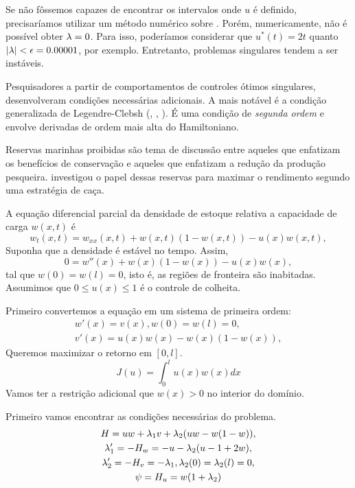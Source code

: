 Se não fôssemos capazes de encontrar os intervalos onde $u$ é definido,
precisaríamos utilizar um método numérico sobre . Porém,
numericamente, não é possível obter $\lambda = 0$. Para isso, poderíamos
considerar que $u^*(t) = 2t$ quanto $|\lambda| < \epsilon = 0.00001$, por exemplo.
Entretanto, problemas singulares tendem a ser instáveis. 

Pesquisadores a partir de comportamentos de controles ótimos singulares,
desenvolveram condições necessárias adicionais. A mais notável é a condição
generalizada de Legendre-Clebsh (\cite{Tsypkin1970AppliedOC}, \cite{Grossmann1984}, \cite{krener1977}). É uma condição de \textit{segunda ordem} e
envolve derivadas de ordem mais alta do Hamiltoniano. 

\begin{example}
    Reservas marinhas proibidas são tema de discussão entre aqueles que
    enfatizam os benefícios de conservação e aqueles que enfatizam a redução
    da produção pesqueira. \cite{neubert2003} investigou o papel dessas reservas para
    maximar o rendimento segundo uma estratégia de caça. 

    A equação diferencial parcial da densidade de estoque relativa a
    capacidade de carga $w(x,t)$ é 
    $$ 
    w_t(x,t) = w_{xx}(x,t) + w(x,t)(1 - w(x,t)) - u(x)w(x,t),
    $$
    Suponha que a densidade é estável no tempo. Assim, 
    $$
    0 = w''(x) + w(x)(1 - w(x)) - u(x)w(x),
    $$
    tal que $w(0) = w(l) = 0$, isto é, as regiões de fronteira são inabitadas.
    Assumimos que $0 \le u(x) \le 1$ é o controle de colheita. 

    Primeiro convertemos a equação em um sistema de primeira ordem:
    \begin{gather*}
        w'(x) = v(x), w(0) = w(l) = 0, \\
        v'(x) = u(x)w(x) - w(x)(1 - w(x)), 
    \end{gather*}
    Queremos maximizar o retorno em $[0,l]$.
    $$
    J(u) = \int_0^l u(x)w(x) dx
    $$
    Vamos ter a restrição adicional que $w(x) > 0$ no interior do domínio. 
\end{example}

Primeiro vamos encontrar as condições necessárias do problema. 
\begin{gather*}
    H = uw + \lambda_1 v + \lambda_2(uw - w(1 - w)), \\
    \lambda_1 ' = -H_w = -u - \lambda_2(u - 1 + 2w), \\
    \lambda_2 ' = -H_v = - \lambda_1, \lambda_2(0) = \lambda_2(l) = 0, \\
    \psi = H_u = w(1 + \lambda_2)
\end{gather*}

